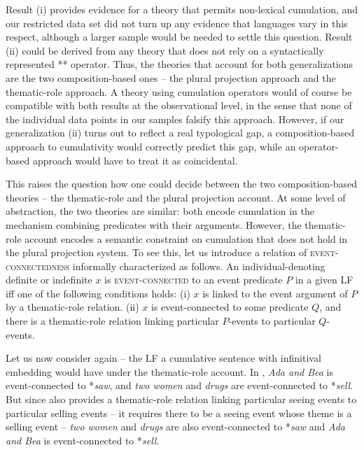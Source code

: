 \documentclass[output=paper]{langscibook}
\begin{document}
Result (i) provides evidence for a theory that permits non-lexical cumulation, and our restricted data set did not turn up any evidence that languages vary in this respect, although a larger sample would be needed to settle this question. Result (ii) could be derived from any theory that does not rely on a syntactically represented ** operator. Thus, the theories that account for both generalizations are the two composition-based ones -- the plural projection approach and the thematic-role approach. A theory using cumulation operators would of course be compatible with both results at the observational level, in the sense that none of the individual data points in our samples falsify this approach. However, if our generalization (ii) turns out to reflect a real typological gap, a composition-based approach to cumulativity would correctly predict this gap, while an operator-based approach would have to treat it as coincidental.

This raises the question how one could decide between the two composition-based theories -- the thematic-role and the plural projection account. At some level of abstraction, the two theories are similar: both encode cumulation in the mechanism combining predicates with their arguments. However, the thematic-role account encodes a semantic constraint on cumulation that does not hold in the plural projection system. To see this, let us introduce a relation of \textsc{event-connectedness} informally characterized as follows. An individual-denoting definite or indefinite $x$ is \textsc{event-connected} to an event predicate $P$ in a given LF iff one of the following conditions holds: (i) $x$ is linked to the event argument of $P$ by a thematic-role relation. (ii) $x$ is event-connected to some predicate $Q$, and there is a thematic-role relation linking particular $P$-events to particular $Q$-events.

Let us now consider  again -- the LF a cumulative sentence with infinitival embedding would have under the thematic-role account. In , \textit{Ada and Bea} is event-connected to *\textit{saw}, and \textit{two women} and \textit{drugs} are event-connected to *\textit{sell}. But since  also provides a thematic-role relation linking particular seeing events to particular selling events -- it requires there to be a seeing event whose theme is a selling event -- \textit{two women} and \textit{drugs} are also event-connected to *\textit{saw} and \textit{Ada and Bea} is event-connected to *\textit{sell}.
\end{document}
